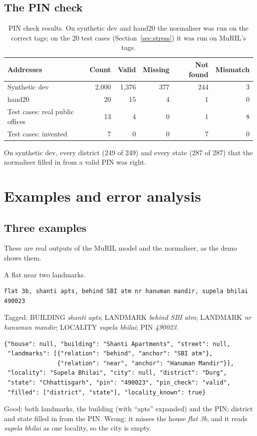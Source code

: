 \documentclass[11pt,a4paper]{article}
\begin{document}
\subsection{The PIN check}
\begin{table}[H]
\centering\small
\caption[PIN check results]{PIN check results. On synthetic dev and hand20 the normaliser was run on the correct tags; on the 20 test
cases (Section~\ref{sec:stress}) it was run on MuRIL's tags.}\label{tab:pin}
\begin{tabular}{lrrrrr}
\toprule
\textbf{Addresses} & \textbf{Count} & \textbf{Valid} & \textbf{Missing} & \textbf{Not found} & \textbf{Mismatch}\\
\midrule
Synthetic dev & 2,000 & 1,376 & 377 & 244 & 3\\
hand20 & 20 & 15 & 4 & 1 & 0\\
Test cases: real public offices & 13 & 4 & 0 & 1 & 8\\
Test cases: invented & 7 & 0 & 0 & 7 & 0\\
\bottomrule
\end{tabular}
\end{table}
On synthetic dev, every district (249 of 249) and every state (287 of 287) that the normaliser filled in from a valid
PIN was right.

\section{Examples and error analysis}\label{sec:errors}

\subsection{Three examples}
These are real outputs of the MuRIL model and the normaliser, as the demo shows them.

 A flat near two landmarks.
\begin{lstlisting}
flat 3b, shanti apts, behind SBI atm nr hanuman mandir, supela bhilai 490023
\end{lstlisting}
Tagged: BUILDING \emph{shanti apts}; LANDMARK \emph{behind SBI atm}; LANDMARK \emph{nr hanuman mandir}; LOCALITY
\emph{supela bhilai}; PIN \emph{490023}.
\begin{lstlisting}
{"house": null, "building": "Shanti Apartments", "street": null,
 "landmarks": [{"relation": "behind", "anchor": "SBI atm"},
               {"relation": "near", "anchor": "Hanuman Mandir"}],
 "locality": "Supela Bhilai", "city": null, "district": "Durg",
 "state": "Chhattisgarh", "pin": "490023", "pin_check": "valid",
 "filled": ["district", "state"], "locality_known": true}
\end{lstlisting}
Good: both landmarks, the building (with ``apts'' expanded) and the PIN; district and state filled in from the PIN.
Wrong: it misses the house \emph{flat 3b}, and it reads \emph{supela bhilai} as one locality, so the city is empty.
\end{document}
